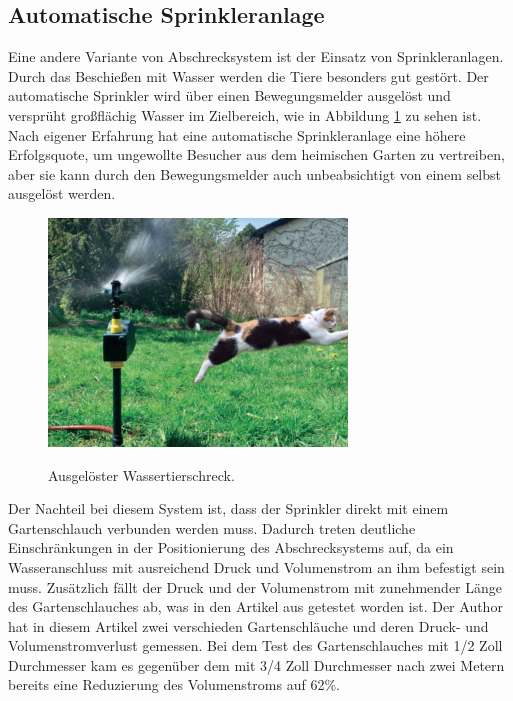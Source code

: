 \subsection{Automatische Sprinkleranlage} \label{sprinkler}

Eine andere Variante von Abschrecksystem ist der Einsatz von Sprinkleranlagen. Durch das Beschießen mit Wasser werden die Tiere besonders gut gestört. Der automatische Sprinkler wird über einen Bewegungsmelder ausgelöst und versprüht großflächig Wasser im Zielbereich, wie in Abbildung \ref{fig:katzenschreck} zu sehen ist. Nach eigener Erfahrung hat eine automatische Sprinkleranlage eine höhere Erfolgsquote, um ungewollte Besucher aus dem heimischen Garten zu vertreiben, aber sie kann durch den Bewegungsmelder auch unbeabsichtigt von einem selbst ausgelöst werden.\cite{anti_wasch}

\begin{figure}[h]
    \centering
    \includegraphics[width=\textwidth]{images/Wasser-Katzenschreck-300x229.png}
    \label{fig:katzenschreck}
    \caption{Ausgelöster Wassertierschreck. \cite{katzenverscheuchen}}
\end{figure}

Der Nachteil bei diesem System ist, dass der Sprinkler direkt mit einem Gartenschlauch verbunden werden muss. Dadurch treten deutliche Einschränkungen in der Positionierung des Abschrecksystems auf, da ein Wasseranschluss mit ausreichend Druck und Volumenstrom an ihm befestigt sein muss. Zusätzlich fällt der Druck und der Volumenstrom mit zunehmender Länge des Gartenschlauches ab, was in den Artikel aus \cite{bewaesserung_foerderverlust} getestet worden ist. Der Author hat in diesem Artikel zwei verschieden Gartenschläuche und deren Druck- und Volumenstromverlust gemessen. Bei dem Test des Gartenschlauches mit 1/2 Zoll Durchmesser kam es gegenüber dem mit 3/4 Zoll Durchmesser nach zwei Metern bereits eine Reduzierung des Volumenstroms auf 62\%.
\\

